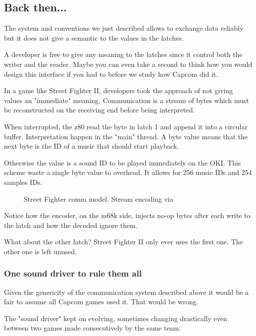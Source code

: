 \subsection{Back then...}
The system and conventions we just described allows to exchange data reliably but it does not give a semantic to the values in the latches. 

A developer is free to give any meaning to the latches since it control both the writer and the reader. Maybe you can even take a second to think how you would design this interface if you had to before we study how Capcom did it.

In a game like Street Fighter II, developers took the approach of not giving values an "immediate" meaning. Communication is a stream of bytes which must be reconstructed on the receiving end before being interpreted.



When interrupted, the z80 read the byte in latch 1 and append it into a circular buffer. Interpretation happen in the "main" thread. A byte value  means that the next byte is the ID of a music that should start playback. 

Otherwise the value is a sound ID to be played immediately on the OKI. This scheme waste a single byte value to overhead. It allows for 256 music IDs and 254 samples IDs.

 \begin{figure}[H]
\caption*{Street Fighter comm model. Stream encoding via }
\end{figure}

Notice how the encoder, on the m68k side, injects  no-op bytes after each write to the latch and how the decoded ignore them.

What about the other latch? Street Fighter II only ever uses the first one. The other one is left unused.

\subsubsection{One sound driver to rule them all}

Given the genericity of the communication system described above it would be a fair to assume all Capcom games used it. That would be wrong.

The "sound driver" kept on evolving, sometimes changing drastically even between two games made consecutively by the same team. 

